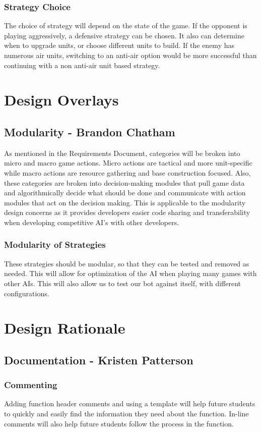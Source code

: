 \documentclass[10pt,letterpaper,onecolumn,draftclsnofoot]{IEEEtran}
\begin{document}
\subsubsection{Strategy Choice}
	The choice of strategy will depend on the state of the game. If the opponent is playing aggressively, a defensive strategy can be chosen. It also can determine when to upgrade units, or choose different units to build. If the enemy has numerous air units, switching to an anti-air option would be more successful than continuing with a non anti-air unit based strategy. 

\section{Design Overlays}
\subsection{Modularity - Brandon Chatham}
	As mentioned in the Requirements Document, categories will be broken into micro and macro game actions. Micro actions are tactical and more unit-specific while macro actions are resource gathering and base construction focused. Also, these categories are broken into decision-making modules that pull game data and algorithmically decide what should be done and communicate with action modules that act on the decision making. This is applicable to the modularity design concerns as it provides developers easier code sharing and transferability when developing competitive AI's with other developers. 
\subsubsection{Modularity of Strategies}
	These strategies should be modular, so that they can be tested and removed as needed. This will allow for optimization of the AI when playing many games with other AIs. This will also allow us to test our bot against itself, with different configurations.
\section{Design Rationale}
\subsection{Documentation - Kristen Patterson}
\subsubsection{Commenting}
	Adding function header comments and using a template will help future students to quickly and easily find the information they need about the function. In-line comments will also help future students follow the process in the function.
\end{document}
